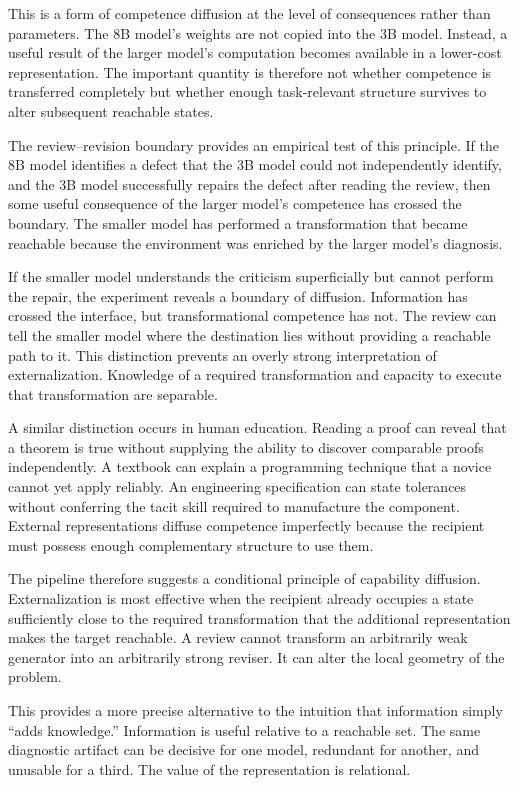 \documentclass[11pt]{article}
\begin{document}
This is a form of competence diffusion at the level of consequences rather than parameters. The 8B model's weights are not copied into the 3B model. Instead, a useful result of the larger model's computation becomes available in a lower-cost representation. The important quantity is therefore not whether competence is transferred completely but whether enough task-relevant structure survives to alter subsequent reachable states.

The review--revision boundary provides an empirical test of this principle. If the 8B model identifies a defect that the 3B model could not independently identify, and the 3B model successfully repairs the defect after reading the review, then some useful consequence of the larger model's competence has crossed the boundary. The smaller model has performed a transformation that became reachable because the environment was enriched by the larger model's diagnosis.

If the smaller model understands the criticism superficially but cannot perform the repair, the experiment reveals a boundary of diffusion. Information has crossed the interface, but transformational competence has not. The review can tell the smaller model where the destination lies without providing a reachable path to it. This distinction prevents an overly strong interpretation of externalization. Knowledge of a required transformation and capacity to execute that transformation are separable.

A similar distinction occurs in human education. Reading a proof can reveal that a theorem is true without supplying the ability to discover comparable proofs independently. A textbook can explain a programming technique that a novice cannot yet apply reliably. An engineering specification can state tolerances without conferring the tacit skill required to manufacture the component. External representations diffuse competence imperfectly because the recipient must possess enough complementary structure to use them.

The pipeline therefore suggests a conditional principle of capability diffusion. Externalization is most effective when the recipient already occupies a state sufficiently close to the required transformation that the additional representation makes the target reachable. A review cannot transform an arbitrarily weak generator into an arbitrarily strong reviser. It can alter the local geometry of the problem.

This provides a more precise alternative to the intuition that information simply ``adds knowledge.'' Information is useful relative to a reachable set. The same diagnostic artifact can be decisive for one model, redundant for another, and unusable for a third. The value of the representation is relational.
\end{document}
